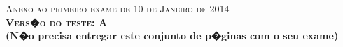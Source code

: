 \documentclass{docist}
\begin{document}
\thispagestyle{empty}

\begin{center}
  {\Large \textsc{Anexo ao primeiro exame de 10 de Janeiro de 2014\\[2ex]
      \textbf{Vers�o do teste: A}\\[2ex]}}
  {\normalsize  \textbf{(N�o precisa entregar este conjunto de p�ginas com o seu exame)}}
\end{center}




\qGPReceiverWriterStyle

\qGPCarbonRelay

\qGPComposerUIQuality

\qMWQualities

\qMWArchitecuralStyle

\qMWReliabilityTactics

\qMWReliabilityReadsImplementation

\qMWResourceLoaderTactic

\qCHSecurityQuality

\qCHPerformanceQuality

\qCHMobilityArchitecturalStyle

\qCHAmazonSilkTwo

\qCHSecurityLevel

\qCHOmniboxTactics

\qGMPicklePerformance

\qGMRestModularity

\qGMPipesFiltersData

\qGMReliabilityFIFO

\qGMMasterRunner

\qGMMessagesPersistence

\qInstallImplementationStyles

\qFenixTwo

\qElasticityDeferBinding

\qUnitOfWork

\qAvailabilityVoting

\qSecurityInternalSource

\qDataModel

\qPublishSubscribe

\qUsabilityNonArchitectural

\qWorldWide
\end{document}

